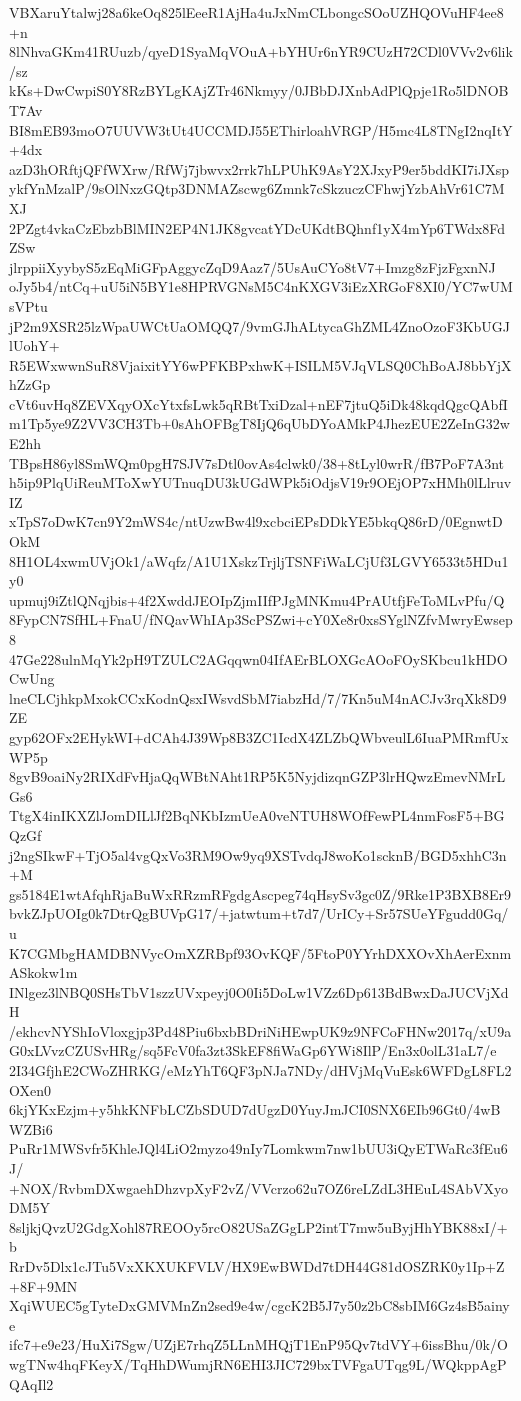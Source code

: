 VBXaruYtalwj28a6keOq825lEeeR1AjHa4uJxNmCLbongcSOoUZHQOVuHF4ee8+n
8lNhvaGKm41RUuzb/qyeD1SyaMqVOuA+bYHUr6nYR9CUzH72CDl0VVv2v6lik/sz
kKs+DwCwpiS0Y8RzBYLgKAjZTr46Nkmyy/0JBbDJXnbAdPlQpje1Ro5lDNOBT7Av
BI8mEB93moO7UUVW3tUt4UCCMDJ55EThirloahVRGP/H5mc4L8TNgI2nqItY+4dx
azD3hORftjQFfWXrw/RfWj7jbwvx2rrk7hLPUhK9AsY2XJxyP9er5bddKI7iJXsp
ykfYnMzalP/9sOlNxzGQtp3DNMAZscwg6Zmnk7cSkzuczCFhwjYzbAhVr61C7MXJ
2PZgt4vkaCzEbzbBlMIN2EP4N1JK8gvcatYDcUKdtBQhnf1yX4mYp6TWdx8FdZSw
jlrppiiXyybyS5zEqMiGFpAggycZqD9Aaz7/5UsAuCYo8tV7+Imzg8zFjzFgxnNJ
oJy5b4/ntCq+uU5iN5BY1e8HPRVGNsM5C4nKXGV3iEzXRGoF8XI0/YC7wUMsVPtu
jP2m9XSR25lzWpaUWCtUaOMQQ7/9vmGJhALtycaGhZML4ZnoOzoF3KbUGJlUohY+
R5EWxwwnSuR8VjaixitYY6wPFKBPxhwK+ISILM5VJqVLSQ0ChBoAJ8bbYjXhZzGp
cVt6uvHq8ZEVXqyOXcYtxfsLwk5qRBtTxiDzal+nEF7jtuQ5iDk48kqdQgcQAbfI
m1Tp5ye9Z2VV3CH3Tb+0sAhOFBgT8IjQ6qUbDYoAMkP4JhezEUE2ZeInG32wE2hh
TBpsH86yl8SmWQm0pgH7SJV7sDtl0ovAs4clwk0/38+8tLyl0wrR/fB7PoF7A3nt
h5ip9PlqUiReuMToXwYUTnuqDU3kUGdWPk5iOdjsV19r9OEjOP7xHMh0lLlruvIZ
xTpS7oDwK7cn9Y2mWS4c/ntUzwBw4l9xcbciEPsDDkYE5bkqQ86rD/0EgnwtDOkM
8H1OL4xwmUVjOk1/aWqfz/A1U1XskzTrjljTSNFiWaLCjUf3LGVY6533t5HDu1y0
upmuj9iZtlQNqjbis+4f2XwddJEOIpZjmIIfPJgMNKmu4PrAUtfjFeToMLvPfu/Q
8FypCN7SfHL+FnaU/fNQavWhIAp3ScPSZwi+cY0Xe8r0xsSYglNZfvMwryEwsep8
47Ge228ulnMqYk2pH9TZULC2AGqqwn04IfAErBLOXGcAOoFOySKbcu1kHDOCwUng
lneCLCjhkpMxokCCxKodnQsxIWsvdSbM7iabzHd/7/7Kn5uM4nACJv3rqXk8D9ZE
gyp62OFx2EHykWI+dCAh4J39Wp8B3ZC1IcdX4ZLZbQWbveulL6IuaPMRmfUxWP5p
8gvB9oaiNy2RIXdFvHjaQqWBtNAht1RP5K5NyjdizqnGZP3lrHQwzEmevNMrLGs6
TtgX4inIKXZlJomDILlJf2BqNKbIzmUeA0veNTUH8WOfFewPL4nmFosF5+BGQzGf
j2ngSIkwF+TjO5al4vgQxVo3RM9Ow9yq9XSTvdqJ8woKo1scknB/BGD5xhhC3n+M
gs5184E1wtAfqhRjaBuWxRRzmRFgdgAscpeg74qHsySv3gc0Z/9Rke1P3BXB8Er9
bvkZJpUOIg0k7DtrQgBUVpG17/+jatwtum+t7d7/UrICy+Sr57SUeYFgudd0Gq/u
K7CGMbgHAMDBNVycOmXZRBpf93OvKQF/5FtoP0YYrhDXXOvXhAerExnmASkokw1m
INlgez3lNBQ0SHsTbV1szzUVxpeyj0O0Ii5DoLw1VZz6Dp613BdBwxDaJUCVjXdH
/ekhcvNYShIoVloxgjp3Pd48Piu6bxbBDriNiHEwpUK9z9NFCoFHNw2017q/xU9a
G0xLVvzCZUSvHRg/sq5FcV0fa3zt3SkEF8fiWaGp6YWi8IlP/En3x0olL31aL7/e
2I34GfjhE2CWoZHRKG/eMzYhT6QF3pNJa7NDy/dHVjMqVuEsk6WFDgL8FL2OXen0
6kjYKxEzjm+y5hkKNFbLCZbSDUD7dUgzD0YuyJmJCI0SNX6EIb96Gt0/4wBWZBi6
PuRr1MWSvfr5KhleJQl4LiO2myzo49nIy7Lomkwm7nw1bUU3iQyETWaRc3fEu6J/
+NOX/RvbmDXwgaehDhzvpXyF2vZ/VVcrzo62u7OZ6reLZdL3HEuL4SAbVXyoDM5Y
8sljkjQvzU2GdgXohl87REOOy5rcO82USaZGgLP2intT7mw5uByjHhYBK88xI/+b
RrDv5Dlx1cJTu5VxXKXUKFVLV/HX9EwBWDd7tDH44G81dOSZRK0y1Ip+Z+8F+9MN
XqiWUEC5gTyteDxGMVMnZn2sed9e4w/cgcK2B5J7y50z2bC8sbIM6Gz4sB5ainye
ifc7+e9e23/HuXi7Sgw/UZjE7rhqZ5LLnMHQjT1EnP95Qv7tdVY+6issBhu/0k/O
wgTNw4hqFKeyX/TqHhDWumjRN6EHI3JIC729bxTVFgaUTqg9L/WQkppAgPQAqIl2
